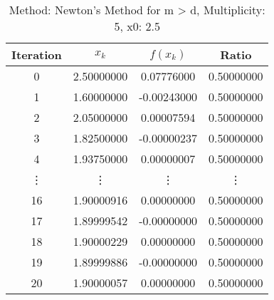 \begin{table}
\centering
\caption{Method: Newton's Method for m > d, Multiplicity: 5, x0: 2.5}
\label{tab:table_Newton's_Method_for_m_>_d_5_2_5}
\begin{tabular}{c c c c}
\toprule
Iteration &      $x_k$ &    $f(x_k)$ &      Ratio \\
\midrule
        0 & 2.50000000 &  0.07776000 & 0.50000000 \\
        1 & 1.60000000 & -0.00243000 & 0.50000000 \\
        2 & 2.05000000 &  0.00007594 & 0.50000000 \\
        3 & 1.82500000 & -0.00000237 & 0.50000000 \\
        4 & 1.93750000 &  0.00000007 & 0.50000000 \\
   \vdots &     \vdots &      \vdots &     \vdots \\
       16 & 1.90000916 &  0.00000000 & 0.50000000 \\
       17 & 1.89999542 & -0.00000000 & 0.50000000 \\
       18 & 1.90000229 &  0.00000000 & 0.50000000 \\
       19 & 1.89999886 & -0.00000000 & 0.50000000 \\
       20 & 1.90000057 &  0.00000000 & 0.50000000 \\
\bottomrule
\end{tabular}
\end{table}

